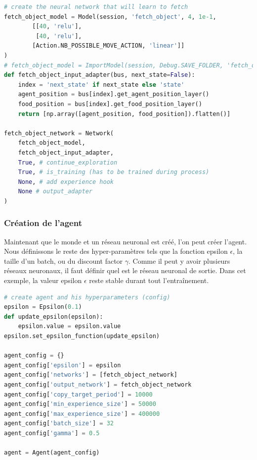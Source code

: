 \documentclass[11pt,a4paper]{report}
\begin{document}
  \begin{lstlisting}[language=python]
# create the neural network that will learn to fetch
fetch_object_model = Model(session, 'fetch_object', 4, 1e-1,
        [[40, 'relu'],
         [40, 'relu'],
        [Action.NB_POSSIBLE_MOVE_ACTION, 'linear']]
)
# fetch_object_model = ImportModel(session, Debug.SAVE_FOLDER, 'fetch_object')
def fetch_object_input_adapter(bus, next_state=False):
    index = 'next_state' if next_state else 'state'
    agent_position = bus[index].get_agent_position_layer()
    food_position = bus[index].get_food_position_layer()
    return [np.array([agent_position, food_position]).flatten()]

fetch_object_network = Network(
    fetch_object_model,
    fetch_object_input_adapter,
    True, # continue_exploration
    True, # is_training (has to be trained during process)
    None, # add experience hook
    None # output_adapter
)
  \end{lstlisting}  
  
  \subsubsection{Création de l'agent} 
  
  \par Maintenant que le monde et un réseau neuronal est créé, l'on peut créer l'agent. Nous définissons le reste des hyper-paramètres tels que la fonction epsilon $\epsilon$, la taille d'un batch, ou du discount factor $\gamma$. Comme il peut y avoir plusieurs réseaux neuronaux, il faut définir quel est le réseau neuronal de sortie. Dans cet exemple, la valeur epsilon $\epsilon$ reste stable durant tout l’entraînement. 

  \begin{lstlisting}[language=python]
# create agent and his hyperparameters (config)
epsilon = Epsilon(0.1)
def update_epsilon(epsilon):
    epsilon.value = epsilon.value
epsilon.set_epsilon_function(update_epsilon)

agent_config = {}
agent_config['epsilon'] = epsilon
agent_config['networks'] = [fetch_object_network]
agent_config['output_network'] = fetch_object_network
agent_config['copy_target_period'] = 10000
agent_config['min_experience_size'] = 50000
agent_config['max_experience_size'] = 400000
agent_config['batch_size'] = 32
agent_config['gamma'] = 0.5

agent = Agent(agent_config)
  \end{lstlisting} 
\end{document}
